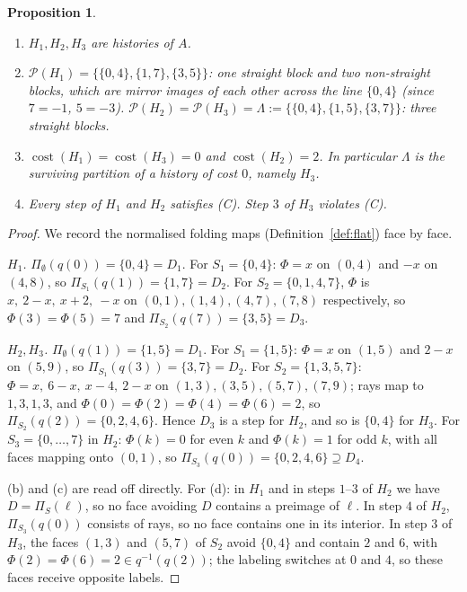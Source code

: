 \documentclass[11pt]{amsart}
\newtheorem{proposition}[theorem]{Proposition}
\theoremstyle{definition}
\theoremstyle{remark}
\newcommand{\arc}[2]{(#1,#2)}
\newcommand{\cost}{\operatorname{cost}}
\newcommand{\Surv}{\mathcal{P}}
\begin{document}
\begin{proposition}\label{prop:base}\leavevmode
\begin{enumerate}[label=(\alph*)]
\item $H_1,H_2,H_3$ are histories of $A$.
\item $\Surv(H_1)=\{\{0,4\},\{1,7\},\{3,5\}\}$: one straight block and two non-straight blocks,
which are mirror images of each other across the line $\{0,4\}$ (since $7=-1$, $5=-3$).
$\Surv(H_2)=\Surv(H_3)=\Lambda:=\{\{0,4\},\{1,5\},\{3,7\}\}$: three straight blocks.
\item $\cost(H_1)=\cost(H_3)=0$ and $\cost(H_2)=2$. In particular $\Lambda$ is the surviving
partition of a history of cost $0$, namely $H_3$.
\item Every step of $H_1$ and $H_2$ satisfies (C). Step $3$ of $H_3$ violates (C).
\end{enumerate}
\end{proposition}
\begin{proof}
We record the normalised folding maps (Definition~\ref{def:flat}) face by face.

\emph{$H_1$.} $\Pi_\emptyset(q(0))=\{0,4\}=D_1$. For $S_1=\{0,4\}$:
$\Phi=x$ on $\arc04$ and $-x$ on $\arc48$, so $\Pi_{S_1}(q(1))=\{1,7\}=D_2$.
For $S_2=\{0,1,4,7\}$, $\Phi$ is $x,\ 2-x,\ x+2,\ -x$ on $\arc01,\arc14,\arc47,\arc78$
respectively, so
$\Phi(3)=\Phi(5)=7$ and $\Pi_{S_2}(q(7))=\{3,5\}=D_3$.

\emph{$H_2,H_3$.} $\Pi_\emptyset(q(1))=\{1,5\}=D_1$. For $S_1=\{1,5\}$: $\Phi=x$ on $\arc15$
and $2-x$ on $\arc59$, so $\Pi_{S_1}(q(3))=\{3,7\}=D_2$. For $S_2=\{1,3,5,7\}$:
$\Phi=x,\ 6-x,\ x-4,\ 2-x$ on $\arc13,\arc35,\arc57,\arc79$; rays map to $1,3,1,3$, and
$\Phi(0)=\Phi(2)=\Phi(4)=\Phi(6)=2$, so $\Pi_{S_2}(q(2))=\{0,2,4,6\}$. Hence $D_3$ is a step for
$H_2$, and so is $\{0,4\}$ for $H_3$. For $S_3=\{0,\dots,7\}$ in $H_2$: $\Phi(k)=0$ for even $k$ and $\Phi(k)=1$ for odd $k$,
with all faces mapping onto $\arc01$, so $\Pi_{S_3}(q(0))=\{0,2,4,6\}\supseteq D_4$.

(b) and (c) are read off directly. For (d): in $H_1$ and in steps $1$--$3$ of $H_2$ we have
$D=\Pi_S(\ell)$, so no face avoiding $D$ contains a preimage of $\ell$. In step $4$ of $H_2$,
$\Pi_{S_3}(q(0))$ consists of rays, so no face contains one in its interior. In step $3$ of
$H_3$, the faces $\arc13$ and $\arc57$ of $S_2$ avoid $\{0,4\}$ and contain $2$ and $6$, with
$\Phi(2)=\Phi(6)=2\in q^{-1}(q(2))$; the labeling switches at $0$ and $4$, so these faces
receive opposite labels.
\end{proof}
\end{document}
